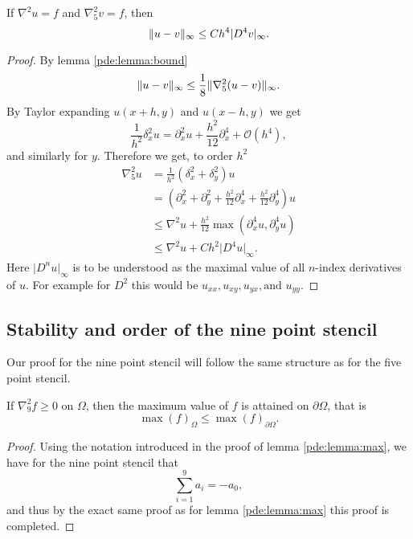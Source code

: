 \begin{theorem}
If $\nabla^2 u = f$ and $\nabla_5^2 v = f$, then
$$
\lVert u - v \rVert_\infty \leq Ch^4 \lvert D^4 v\rvert_\infty.
$$
\end{theorem}
\begin{proof}
By lemma \ref{pde:lemma:bound}
$$
\lVert u - v \rVert_\infty \leq \frac18 \lVert \nabla_5^2 (u  - v) \rVert_\infty.
$$
By Taylor expanding $u(x + h, y)$ and $u(x - h, y)$ we get
$$
\frac{1}{h^2} \delta_x^2 u = \partial_x^2 u + \frac{h^2}{12} \partial_x^4 + \mathcal{O}(h^4),
$$
and similarly for $y$.
Therefore we get, to order $h^2$
\begin{align*}
  \nabla_5^2 u
  &=\frac{1}{h^2} (\delta_x^2 + \delta_y^2) u\\
  &= (\partial_x^2 + \partial_y^2 + \frac{h^2}{12} \partial_x^4 + \frac{h^2}{12} \partial_y^4) u\\
  &\leq \nabla^2 u + \frac{h^2}{12} \max(\partial_x^4 u, \partial_y^4 u)\\
  &\leq \nabla^2 u + C h^2 \lvert D^4 u \rvert_\infty.
\end{align*}
Here $\lvert D^n u\rvert_\infty$ is to be understood as the maximal value of all $n$-index derivatives of $u$.
For example for $D^2$ this would be $u_{xx}, u_{xy}, u_{yx}, \text{and } u_{yy}$.
\end{proof}


\subsection{Stability and order of the nine point stencil}
Our proof for the nine point stencil will follow the same structure as for the five point stencil.

\begin{lemma}\label{pde:lemma:max9}
If $\nabla_9^2 f \geq 0$ on $\Omega$, then the maximum value of $f$ is attained on $\partial \Omega$, that is
$$
\max(f)_\Omega \leq \max(f)_{\partial \Omega}.
$$
\end{lemma}
\begin{proof}
  Using the notation introduced in the proof of lemma \ref{pde:lemma:max}, we have for the nine point stencil that
  $$
  \sum_{i=1}^9 a_i = -a_0,
  $$
  and thus by the exact same proof as for lemma \ref{pde:lemma:max} this proof is completed.
\end{proof}

